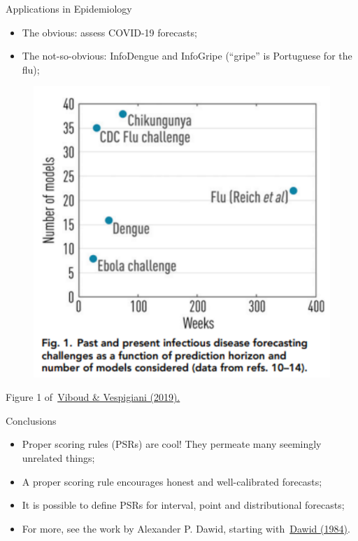 \begin{frame}{Applications in Epidemiology}
\begin{itemize}
 \item The obvious: assess COVID-19 forecasts;
 \item The not-so-obvious: InfoDengue and InfoGripe (``gripe'' is Portuguese for the flu);
\end{itemize} 
 \begin{figure}
 \begin{center}
  \includegraphics[scale=0.55]{figures/diseaseprediction.pdf}
 \end{center}
\end{figure}
Figure 1 of~\href{https://www.pnas.org/content/pnas/116/8/2802.full.pdf}{Viboud \& Vespigiani (2019).}

\end{frame}
\begin{frame}{Conclusions}
\begin{itemize}
 \item Proper scoring rules (PSRs) are cool! 
  They permeate many seemingly unrelated things;
 \item A proper scoring rule encourages honest and well-calibrated forecasts;
 \item It is possible to define PSRs for interval, point and distributional forecasts;
 \item For more, see the work by Alexander P. Dawid, starting with~\href{http://qwone.com/~jason/trg/papers/dawid-prequential-84.pdf}{Dawid (1984)}.
\end{itemize}

\end{frame}
